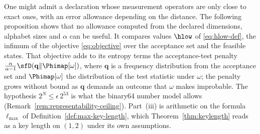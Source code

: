 
One might admit a declaration whose measurement operators are only close
to exact ones, with an error allowance depending on the distance. The
following proposition shows that no allowance computed from the declared
dimensions, alphabet sizes and $\alpha$ can be useful. It compares values
$\hlow$ of \eqref{eq:hlow-def}, the infimum of the objective
\eqref{eq:objective} over the acceptance set and the feasible states. That
objective adds to its entropy terms the acceptance-test penalty
$\frac{\alpha}{\alpha-1}\sfD(\mathbf q\|\Phimap[\omega])$, where
$\mathbf q$ is a frequency distribution from the acceptance set and
$\Phimap[\omega]$ the distribution of the test statistic under $\omega$;
the penalty grows without bound as $\mathbf q$ demands an outcome that
$\omega$ makes improbable. The hypothesis $2^{N}\le\epsilon\,2^{53}$ is
what the binary64 number model allows
(Remark~\ref{rem:representability-ceiling}). Part~(iii) is arithmetic on
the formula $\ell_{\max}$ of Definition~\ref{def:max-key-length}, which
Theorem~\ref{thm:keylength} reads as a key length on $(1,2)$ under its own
assumptions.


